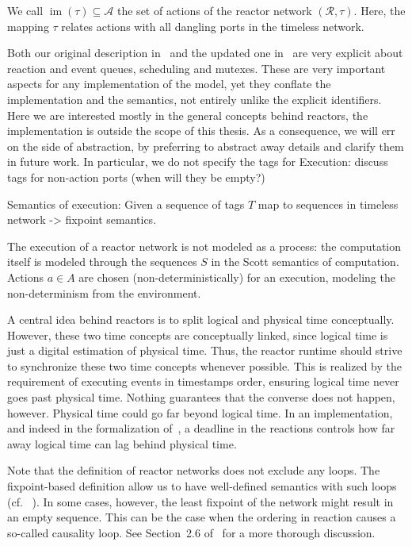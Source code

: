 \begin{defn}
\begin{defn}
\begin{defn}
\begin{defn}
We call $\operatorname{im}(\tau) \subseteq \mathcal{A}$ the set of actions of the reactor network $(\mathcal{R},\tau)$.
Here, the mapping $\tau$ relates actions with all dangling ports in the timeless network.

Both our original description in~\cite{lohstroph_cyphy19} and the updated one in~\cite{lohstroh_phdthesis} are very explicit about reaction and event queues, scheduling and mutexes.
These are very important aspects for any implementation of the model, yet they conflate the implementation and the semantics, not entirely unlike the explicit identifiers.
Here we are interested mostly in the general concepts behind reactors, the implementation is outside the scope of this thesis.
As a consequence, we will err on the side of abstraction, by preferring to abstract away details and clarify them in future work. 
In particular, we do not specify the tags for 
Execution: discuss tags for non-action ports (when will they be empty?)

Semantics of execution:
Given a sequence of tags $T$ map to sequences in timeless network -> fixpoint semantics.

The execution of a reactor network is not modeled as a process: the computation itself is modeled through the sequences $S$ in the Scott semantics of computation.
Actions $a \in A$ are chosen (non-deterministically) for an execution, modeling the non-determinism from the environment.

A central idea behind reactors is to split logical and physical time conceptually.
However, these two time concepts are conceptually linked, since logical time is just a digital estimation of physical time.
Thus, the reactor runtime should strive to synchronize these two time concepts whenever possible.
This is realized by the requirement of executing events in timestamps order, ensuring logical time never goes past physical time.
Nothing guarantees that the converse does not happen, however.
Physical time could go far beyond logical time.
In an implementation, and indeed in the formalization of~\cite{lohstroh_phdthesis}, a deadline in the reactions controls how far away logical time can lag behind physical time. 

Note that the definition of reactor networks does not exclude any loops.
The fixpoint-based definition allow us to have well-defined semantics with such loops (cf. ~\cite{kahn_74,lee_matsikoudis_semantics}).
In some cases, however, the least fixpoint of the network might result in an empty sequence.
This can be the case when the ordering in reaction causes a so-called causality loop.
See Section~2.6 of~\cite{lohstroh_phdthesis} for a more thorough discussion.


\end{defn}
\end{defn}
\end{defn}
\end{defn}
